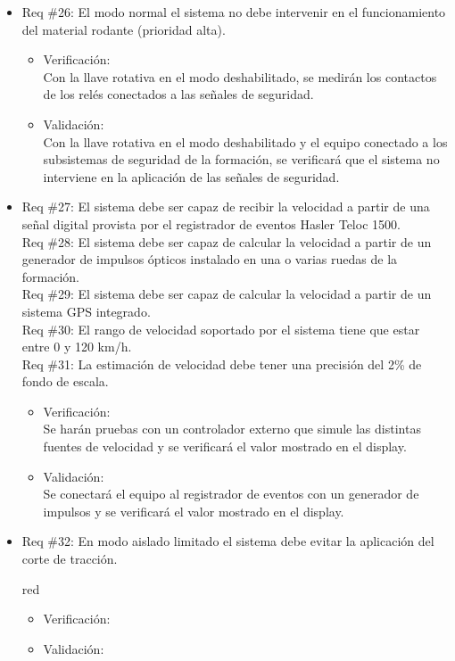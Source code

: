 \documentclass[11pt]{charter}
\begin{document}
\begin{itemize}
\item Req \#26: El modo normal el sistema no debe intervenir en el funcionamiento del material rodante (prioridad alta).
\begin{itemize}
  \item Verificación:\\
  Con la llave rotativa en el modo deshabilitado, se medirán los contactos de los relés conectados a las señales de seguridad.
  \item Validación:\\
  Con la llave rotativa en el modo deshabilitado y el equipo conectado a los subsistemas de seguridad de la formación, se verificará que el sistema no interviene en la aplicación de las señales de seguridad.
\end{itemize}

\item Req \#27: El sistema debe ser capaz de recibir la velocidad a partir de una señal digital provista por el registrador de eventos Hasler Teloc 1500. \\
Req \#28: El sistema debe ser capaz de calcular la velocidad a partir de un generador de impulsos ópticos instalado en una o varias ruedas de la formación. \\
Req \#29: El sistema debe ser capaz de calcular la velocidad a partir de un sistema GPS integrado. \\
Req \#30: El rango de velocidad soportado por el sistema tiene que estar entre 0 y 120 km/h. \\
Req \#31: La estimación de velocidad debe tener una precisión del 2\% de fondo de escala.
\begin{itemize}
  \item Verificación:\\
  Se harán pruebas con un controlador externo que simule las distintas fuentes de velocidad y se verificará el valor mostrado en el display.
  \item Validación:\\
  Se conectará el equipo al registrador de eventos con un generador de impulsos y se verificará el valor mostrado en el display.
\end{itemize}

\newpage

\item Req \#32: En modo aislado limitado el sistema debe evitar la aplicación del corte de tracción.
\begin{consigna}{red}
\begin{itemize}
  \item Verificación:\\
  \item Validación:\\
\end{itemize}
\end{consigna}


\end{itemize}
\end{document}
